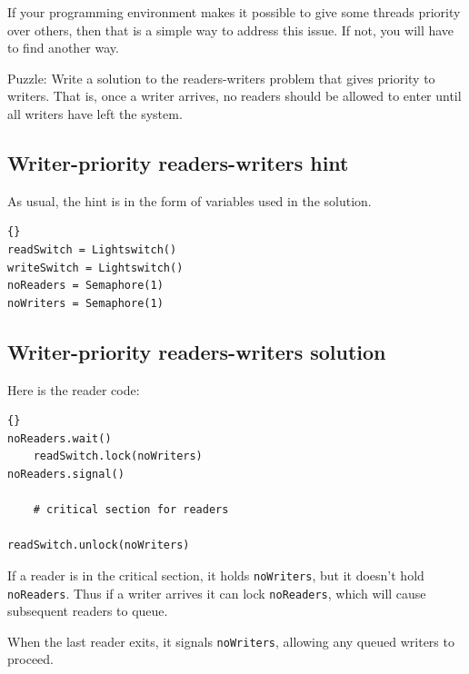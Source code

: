 \documentclass{book}
\newcommand{\clearemptydoublepage}{\newpage\cleardoublepage}
\begin{document}
If your programming environment makes it possible to give
some threads priority over others, then that is a simple way
to address this issue.  If not, you will have to find another
way.

Puzzle: Write a solution to the readers-writers problem that gives
priority to writers.  That is, once a writer arrives, no readers
should be allowed to enter until all writers have left the system.


\clearemptydoublepage
\subsection{Writer-priority readers-writers hint}

As usual, the hint is in the form of variables
used in the solution.

\begin{latin}
\begin{latin}
\begin{lstlisting}[title={Writer-priority readers-writers initialization}]{}
readSwitch = Lightswitch()
writeSwitch = Lightswitch()
noReaders = Semaphore(1)
noWriters = Semaphore(1)
\end{lstlisting}
\end{latin}
\end{latin}


\clearemptydoublepage
\subsection{Writer-priority readers-writers solution}

Here is the reader code:

\begin{latin}
\begin{latin}
\begin{lstlisting}[title={Writer-priority reader solution}]{}
noReaders.wait()
    readSwitch.lock(noWriters)
noReaders.signal()

    # critical section for readers

readSwitch.unlock(noWriters)
\end{lstlisting}
\end{latin}
\end{latin}

If a reader is in the critical section, it holds
{\tt noWriters}, but it doesn't hold {\tt noReaders}.
Thus if a writer arrives it can lock {\tt noReaders},
which will cause subsequent readers to queue.

When the last reader exits, it signals {\tt noWriters},
allowing any queued writers to proceed.
\end{document}

